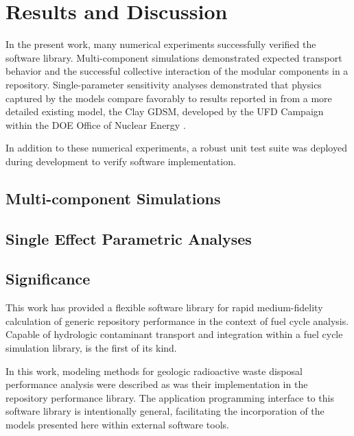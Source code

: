 \section{Results and Discussion}
\label{sec:results}

In the present work, many numerical experiments successfully verified the \Cyder software library.
Multi-component simulations demonstrated expected transport behavior and
the successful collective interaction of the modular
components in a \Cyder repository. Single-parameter sensitivity analyses
demonstrated that physics captured by the \Cyder models compare favorably to
results reported in \cite{huff_key_2012} from a more detailed existing model,
the Clay \gls{GDSM}, developed by the \gls{UFD} Campaign within the
\gls{DOE} Office of Nuclear Energy \cite{clayton_generic_2011}.

In addition to these numerical experiments, a robust unit test suite was
deployed during development to verify \Cyder software implementation.

\subsection{Multi-component Simulations}




\subsection{Single Effect Parametric Analyses}


\subsection{Significance}

This work has provided a flexible software library for rapid medium-fidelity
calculation of generic repository performance in the context of fuel cycle
analysis.  Capable of hydrologic contaminant transport and integration within a
fuel cycle simulation library, \Cyder is the first of its kind.

In this work, modeling methods for geologic radioactive waste disposal
performance analysis were described as was their implementation in the \Cyder
repository performance library. The application programming interface to this
software library is intentionally general, facilitating the incorporation of
the models presented here within external software tools.

